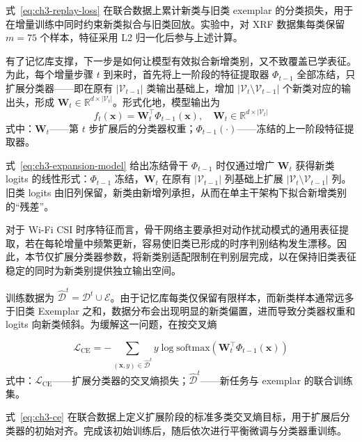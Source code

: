式~\eqref{eq:ch3-replay-loss} 在联合数据上累计新类与旧类 exemplar 的分类损失，用于在增量训练中同时约束新类拟合与旧类回放。实验中，对 XRF 数据集每类保留 $m=75$ 个样本，特征采用 L2 归一化后参与上述计算。


有了记忆库支撑，下一步是如何让模型有效拟合新增类别，又不致覆盖已学表征。为此，每个增量步骤 $t$ 到来时，首先将上一阶段的特征提取器 $\Phi_{t-1}$ 全部冻结，只扩展分类器——即在原有 $|\mathcal{V}_{t-1}|$ 类输出基础上，增加 $|\mathcal{V}_t \setminus \mathcal{V}_{t-1}|$ 个新类对应的输出头，形成 $\mathbf{W}_t \in \mathbb{R}^{d \times |\mathcal{V}_t|}$。形式化地，模型输出为
\begin{equation}\label{eq:ch3-expansion-model}
f_t(\mathbf{x}) = \mathbf{W}_t^\top \Phi_{t-1}(\mathbf{x}), \quad \mathbf{W}_t \in \mathbb{R}^{d \times |\mathcal{V}_t|}
\end{equation}
\noindent 式中：$\mathbf{W}_t$——第 $t$ 步扩展后的分类器权重；$\Phi_{t-1}(\cdot)$——冻结的上一阶段特征提取器。

式~\eqref{eq:ch3-expansion-model} 给出冻结骨干 $\Phi_{t-1}$ 时仅通过增广 $\mathbf{W}_t$ 获得新类 logits 的线性形式：$\Phi_{t-1}$ 冻结，$\mathbf{W}_t$ 在原有 $|\mathcal{V}_{t-1}|$ 列基础上扩展 $|\mathcal{V}_t \setminus \mathcal{V}_{t-1}|$ 列。旧类 logits 由旧列保留，新类由新增列承担，从而在单主干架构下拟合新增类别的“残差”。

对于 Wi-Fi CSI 时序特征而言，骨干网络主要承担对动作扰动模式的通用表征提取，若在每轮增量中频繁更新，容易使旧类已形成的时序判别结构发生漂移。因此，本节仅扩展分类器参数，将新类别适配限制在判别层完成，以在保持旧类表征稳定的同时为新类别提供独立输出空间。

训练数据为 $\hat{\mathcal{D}}^t = \mathcal{D}^t \cup \mathcal{E}$。由于记忆库每类仅保留有限样本，而新类样本通常远多于旧类 Exemplar 之和，数据分布会出现明显的新类偏置，进而导致分类器权重和 logits 向新类倾斜。为缓解这一问题，在按交叉熵

\begin{equation}\label{eq:ch3-ce}
\mathcal{L}_{\mathrm{CE}} = -\sum_{(\mathbf{x},y) \in \hat{\mathcal{D}}^t} y \log \mathrm{softmax}\left(\mathbf{W}_t^\top \Phi_{t-1}(\mathbf{x})\right)
\end{equation}
\noindent 式中：$\mathcal{L}_{\mathrm{CE}}$——扩展分类器的交叉熵损失；$\hat{\mathcal{D}}^t$——新任务与 exemplar 的联合训练集。

式~\eqref{eq:ch3-ce} 在联合数据上定义扩展阶段的标准多类交叉熵目标，用于扩展后分类器的初始对齐。完成该初始训练后，随后依次进行平衡微调与分类器重训练。


